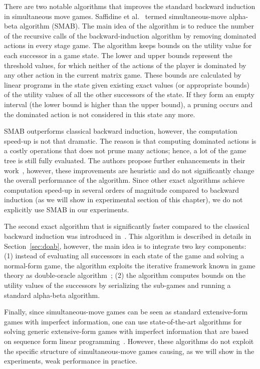 There are two notable algorithms that improves the standard backward induction in simultaneous move games. 
Saffidine et al.~\cite{Saffidine12SMAB} termed simultaneous-move alpha-beta algorithm (SMAB). 
The main idea of the algorithm is to reduce the number of the recursive calls of the backward-induction algorithm by removing dominated actions in every stage game. The algorithm keeps bounds on the utility value for each successor in a game state. 
The lower and upper bounds represent the threshold values, for which neither of the actions of the player is dominated by any other action in the current matrix game. These bounds are calculated by linear programs in the state given existing exact values (or appropriate bounds) of the utility values of all the other successors of the state. If they form an empty interval (the lower bound is higher than the upper bound), a pruning occurs and the dominated action is not considered in this state any more. 

SMAB outperforms classical backward induction, however, the computation speed-up is not that dramatic. 
The reason is that computing dominated actions is a costly operations that does not prune many actions; hence, a lot of the game tree is still fully evaluated. The authors propose further enhancements in their work~\cite{Saffidine12SMAB}, however, these improvements are heuristic and do not significantly change the overall performance of the algorithm. Since other exact algorithms achieve computation speed-up in several orders of magnitude compared to backward induction (as we will show in experimental section of this chapter), we do not explicitly use SMAB in our experiments.

The second exact algorithm that is significantly faster compared to the classical backward induction was introduced in~\cite{Bosansky13Using}.
This algorithm is described in details in Section~\ref{sec:doab}, however, the main idea is to integrate two key components: (1) instead of evaluating all successors in each state of the game and solving a normal-form game, the algorithm exploits the iterative framework known in game theory as double-oracle algorithm~\cite{McMahan03Planning}; (2) the algorithm computes bounds on the utility values of the successors by serializing the sub-games and running a standard alpha-beta algorithm. 

Finally, since simultaneous-move games can be seen as standard extensive-form games with imperfect information, one can use state-of-the-art algorithms for solving generic extensive-form games with imperfect information that are based on sequence form linear programming~\cite{koller1996,bosansky2013-aamas}. However, these algorithms do not exploit the specific structure of simultaneous-move games causing, as we will show in the experiments, weak performance in practice.

